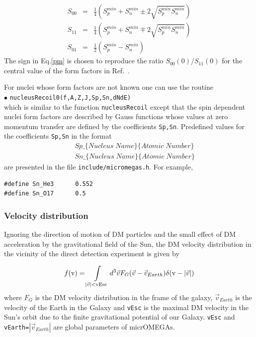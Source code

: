 \documentclass[12pt,a4paper]{article}
\begin{document}
\begin{eqnarray}
\label{pm}
  S_{00}&=& \frac{1}{4} \left(S_p^{min} +S_n^{min} \pm 2 \sqrt{S_p^{min} S_n^{min}}\right)\\
\nonumber
  S_{11}&=& \frac{1}{4}  \left(S_p^{min} +S_n^{min} \mp 2 \sqrt{S_p^{min} S_n^{min}}\right)\\
\nonumber
  S_{01}&=& \frac{1}{2}  (S_p^{min}-S_n^{min}) 
\end{eqnarray} 
The sign in Eq.\ref{pm} is chosen  to reproduce the  ratio $S_{00}(0)/{S}_{11}(0)$ for the central value of the form factors in Ref.~\cite{Klos:2013rwa}.

For nuclei whose form factors  are not known one can use the routine \\
\noindent
$\bullet$ \verb|nucleusRecoil0(f,A,Z,J,Sp,Sn,dNdE)|\\
which is similar to the  function \verb|nucleusRecoil| except that 
the spin dependent nuclei form factors are described by Gauss functions \cite{Belanger:2008sj}
whose values  at zero momentum transfer are defined by the coefficients \verb|Sp,Sn|. 
Predefined values for the coefficients \verb|Sp,Sn| in the format
\begin{eqnarray}
    &&Sp\_\{Nucleus\; Name\}\{Atomic \;Number\} \nonumber\\
    &&Sn\_\{Nucleus\; Name\}\{Atomic\; Number\} \nonumber
\end{eqnarray}
 are presented in the file  \verb|include/micromegas.h|. For example, 
\begin{verbatim}
#define Sn_He3      0.552
#define Sn_O17      0.5
\end{verbatim}

\subsubsection{Velocity distribution}

Ignoring the  direction of motion of DM particles and  the small effect of DM acceleration by the gravitational field of the Sun,
the DM velocity distribution in the vicinity  of the direct detection experiment is given by

\begin{equation} 
f(\mbox{v})=  \int\limits_{|\vec{v}|<\rm{vEsc}} d^3\vec{v} F_G(\vec{v} -\vec{v}_{Earth})
\delta(\mbox{v} -|\vec{v}|) 
\end{equation}
where $F_G$ is the DM velocity distribution in the  frame of the galaxy, $\vec{v}_{Earth}$ is the velocity of the
Earth in the Galaxy and {\tt vEsc} is the maximal DM velocity in the Sun's orbit due to the
finite gravitational potential of our Galaxy. {\tt vEsc} and {\tt vEarth=}$|\vec{v}_{Earth}|$ are global
parameters of micrOMEGAs. 
\end{document}
